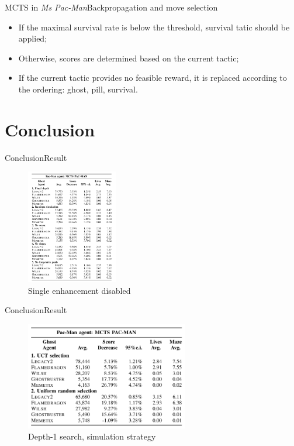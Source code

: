 \documentclass{beamer}
\begin{document}
  \begin{frame}{MCTS in \textit{Ms Pac-Man}}{Backpropagation and move selection}
    \begin{itemize}
      \item If the maximal survival rate is below the threshold, survival tatic should be applied;
      \item Otherwise, scores are determined based on the current tactic;
      \item If the current tactic provides no feasible reward, it is replaced according to the ordering: ghost, pill, survival.
    \end{itemize}
  \end{frame}

  \section{Conclusion}
  \begin{frame}{Conclusion}{Result}
    \begin{figure}
      \includegraphics[height = 5cm]{r_single_disabled.png}
      \caption{Single enhancement disabled}
    \end{figure}
  \end{frame}

  \begin{frame}{Conclusion}{Result}
    \begin{figure}
      \includegraphics[height = 4.7cm]{r_sim.png}
      \caption{Depth-1 search, simulation strategy}
    \end{figure}
  \end{frame}
\end{document}
